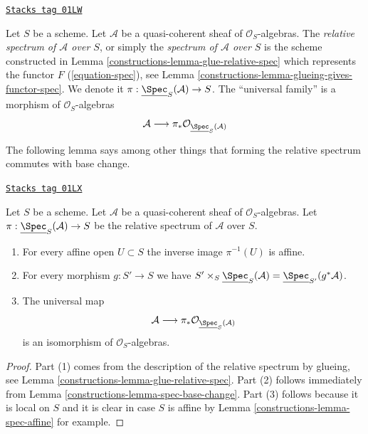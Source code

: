 \begin{definition}
\label{constructions-definition-relative-spec}
\href{https://stacks.math.columbia.edu/tag/01LW}{\texttt{Stacks tag 01LW}}

Let $S$ be a scheme. Let $\mathcal{A}$ be a quasi-coherent sheaf of
$\mathcal{O}_S$-algebras. The {\it relative spectrum of $\mathcal{A}$ over
$S$}, or simply the {\it spectrum of $\mathcal{A}$ over $S$} is the scheme
constructed in Lemma \ref{constructions-lemma-glue-relative-spec} which represents the
functor $F$ (\ref{equation-spec}), see
Lemma \ref{constructions-lemma-glueing-gives-functor-spec}.
We denote it $\pi : \underline{\Spec}_S(\mathcal{A}) \to S$.
The ``universal family'' is a morphism of $\mathcal{O}_S$-algebras
$$
\mathcal{A}
\longrightarrow
\pi_*\mathcal{O}_{\underline{\Spec}_S(\mathcal{A})}
$$
\end{definition}

The following lemma says among other things that forming the
relative spectrum commutes with base change.

\begin{lemma}
\label{constructions-lemma-spec-properties}
\href{https://stacks.math.columbia.edu/tag/01LX}{\texttt{Stacks tag 01LX}}

Let $S$ be a scheme. Let $\mathcal{A}$ be a quasi-coherent
sheaf of $\mathcal{O}_S$-algebras. Let
$\pi : \underline{\Spec}_S(\mathcal{A}) \to S$
be the relative spectrum of $\mathcal{A}$ over $S$.
\begin{enumerate}
\item For every affine open $U \subset S$ the inverse image
$\pi^{-1}(U)$ is affine.
\item For every morphism $g : S' \to S$ we have
$S' \times_S \underline{\Spec}_S(\mathcal{A}) =
\underline{\Spec}_{S'}(g^*\mathcal{A})$.
\item
The universal map
$$
\mathcal{A}
\longrightarrow
\pi_*\mathcal{O}_{\underline{\Spec}_S(\mathcal{A})}
$$
is an isomorphism of $\mathcal{O}_S$-algebras.
\end{enumerate}
\end{lemma}

\begin{proof}

Part (1) comes from the description of the relative spectrum
by glueing, see Lemma \ref{constructions-lemma-glue-relative-spec}.
Part (2) follows immediately from Lemma \ref{constructions-lemma-spec-base-change}.
Part (3) follows because it is local on $S$ and it is clear in case $S$
is affine by Lemma \ref{constructions-lemma-spec-affine} for example.
\end{proof}

